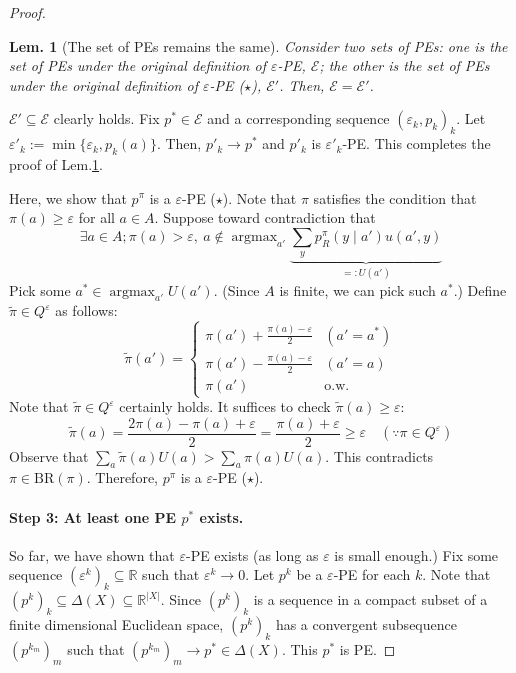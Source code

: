 \documentclass[11pt,a4paper,dvipdfmx]{article}
\theoremstyle{plain}
\newtheorem{lem}{Lem.}[section]
\newcommand{\R}{\mathbb{R}}
\newcommand{\mE}{\mathcal{E}}
\renewcommand{\tilde}{\widetilde}
\renewcommand{\epsilon}{\varepsilon}
\DeclareMathOperator*{\argmax}{argmax}
\begin{document}
\begin{proof}
	\begin{lem}[The set of PEs remains the same] \label{same_lem}
		Consider two sets of PEs: one is the set of PEs under the original definition of $\epsilon$-PE, $\mE$; the other is the set of PEs under the original definition of $\epsilon$-PE ($\star$), $\mE'$.
		Then, $\mE = \mE'$.
	\end{lem}
	$\mE' \subseteq \mE$ clearly holds. Fix $p^* \in \mE$ and a corresponding sequence $(\epsilon_k, p_k)_k$. Let $\epsilon'_k := \min\{ \epsilon_k, p_k(a) \}$. Then, $p'_k \to p^*$ and $p'_k$ is $\epsilon'_k$-PE. This completes the proof of Lem.\ref{same_lem}.
	
	Here, we show that $p^\pi$ is a $\epsilon$-PE ($\star$). Note that $\pi$ satisfies the condition that $\pi(a) \geq \epsilon$ for all $a \in A$. Suppose toward contradiction that 
	\[
	\exists a \in A; \pi(a) > \epsilon, \ a \notin \argmax_{a'} 
	\underbrace{
	\sum_y p^\pi_R(y \mid a')u(a', y)
	}_{=: U(a')}
	\]
	Pick some $a^* \in \argmax_{a'} U(a')$. (Since $A$ is finite, we can pick such $a^*$.)
	Define $\tilde{\pi} \in Q^\epsilon$ as follows:
	\[
	\tilde{\pi}(a') = 
	\begin{cases}
		\pi(a') + \frac{\pi(a) - \epsilon}{2} & (a' = a^*) \\
		\pi(a') - \frac{\pi(a) - \epsilon}{2} & (a' = a) \\
		\pi(a') & \text{o.w.}
	\end{cases}
	\]
	Note that $\tilde{\pi} \in Q^\epsilon$ certainly holds. It suffices to check $\tilde{\pi}(a) \geq \epsilon$:
	\[
	\tilde{\pi}(a) = \frac{2\pi(a) - \pi(a) + \epsilon}{2} = 
	\frac{\pi(a) + \epsilon}{2} \geq \epsilon \quad (\because \pi \in Q^\epsilon)
	\]
	Observe that $\sum_a \tilde{\pi}(a)U(a) > \sum_a \pi(a)U(a)$. This contradicts $\pi \in \text{BR}(\pi)$. Therefore, $p^\pi$ is a $\epsilon$-PE ($\star$).
	
	\paragraph{Step 3: At least one PE $p^*$ exists.}
	So far, we have shown that $\epsilon$-PE exists (as long as $\epsilon$ is small enough.)
	Fix some sequence $(\epsilon^k)_k \subseteq \R$ such that $\epsilon^k \to 0$. Let $p^k$ be a $\epsilon$-PE for each $k$.
	Note that $(p^k)_k \subseteq \Delta(X) \subseteq \R^{ |X| }$. Since $(p^k)_k$ is a sequence in a compact subset of a finite dimensional Euclidean space, $(p^k)_k$ has a convergent subsequence $(p^{k_m})_m$ such that $(p^{k_m})_m \to p^* \in \Delta(X)$. This $p^*$ is PE. 
\end{proof}
\end{document}
